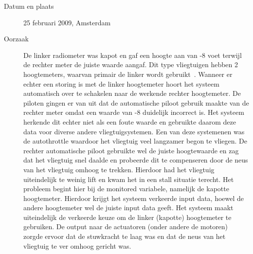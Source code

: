 \documentclass{article}
\begin{document}
\begin{description}
\item[Datum en plaats] 
25 februari 2009, Amsterdam
\item[Oorzaak]
  De linker radiometer was kapot en gaf een hoogte aan van -8 voet terwijl de rechter meter de juiste waarde aangaf. Dit type vliegtuigen hebben 2 hoogtemeters, waarvan primair de linker wordt gebruikt~\cite{neergestorttijdensnadering}. Wanneer er echter een storing is met de linker hoogtemeter hoort het systeem automatisch over te schakelen naar de werkende rechter hoogtemeter. De piloten gingen er van uit dat de automatische piloot gebruik maakte van de rechter meter omdat een waarde van -8 duidelijk incorrect is. Het systeem herkende dit echter niet als een foute waarde en gebruikte daarom deze data voor diverse andere vliegtuigsystemen. Een van deze systemenen was de autothrottle waardoor het vliegtuig veel langzamer begon te vliegen. De rechter automatische piloot gebruikte wel de juiste hoogtewaarde en zag dat het vliegtuig snel daalde en probeerde dit te compenseren door de neus van het vliegtuig omhoog te trekken. Hierdoor had het vliegtuig uiteindelijk te weinig lift en kwam het in een stall situatie terecht.
  Het probleem begint hier bij de monitored variabele, namelijk de kapotte hoogtemeter. Hierdoor krijgt het systeem verkeerde input data, hoewel de andere hoogtemeter wel de juiste input data geeft. Het systeem maakt uiteindelijk de verkeerde keuze om de linker (kapotte) hoogtemeter te gebruiken. De output naar de actuatoren (onder andere de motoren) zorgde ervoor dat de stuwkracht te laag was en dat de neus van het vliegtuig te ver omhoog gericht was.
\end{description}
\end{document}
